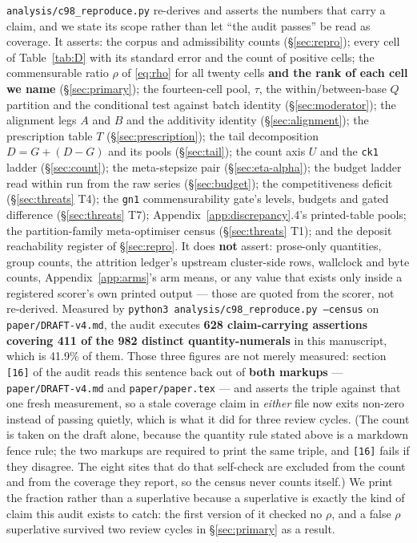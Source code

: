 \documentclass[10pt,letterpaper]{article}
\newcommand{\Dstat}{D}                         %
\newcommand{\Gstat}{G}                         %
\newcommand{\Astat}{A}                         %
\newcommand{\Tstat}{T}                         %
\newcommand{\Ustat}{U}                         %
\newcommand{\arm}[1]{\texttt{#1}}
\begin{document}
\texttt{analysis/c98\_reproduce.py} re-derives and asserts the numbers that carry a claim, and we
state its scope rather than let ``the audit passes'' be read as coverage. It asserts: the corpus
and admissibility counts (\S\ref{sec:repro}); every cell of Table~\ref{tab:D} with its standard
error and the count of positive cells; the commensurable ratio $\rho$ of \eqref{eq:rho} for all
twenty cells \textbf{and the rank of each cell we name} (\S\ref{sec:primary}); the fourteen-cell
pool, $\tau$, the within/between-base $Q$ partition and the conditional test against batch
identity (\S\ref{sec:moderator}); the alignment legs $\Astat$ and $B$ and the additivity identity
(\S\ref{sec:alignment}); the prescription table $\Tstat$ (\S\ref{sec:prescription}); the tail
decomposition $\Dstat = \Gstat + (\Dstat - \Gstat)$ and its pools (\S\ref{sec:tail}); the count
axis $\Ustat$ and the \arm{ck1} ladder (\S\ref{sec:count}); the meta-stepsize pair
(\S\ref{sec:eta-alpha}); the budget ladder read within run from the raw series
(\S\ref{sec:budget}); the competitiveness deficit (\S\ref{sec:threats} T4); the \arm{gn1}
commensurability gate's levels, budgets and gated difference (\S\ref{sec:threats} T7);
Appendix~\ref{app:discrepancy}.4's printed-table pools; the partition-family meta-optimiser
census (\S\ref{sec:threats} T1); and the deposit reachability register of \S\ref{sec:repro}. It
does \textbf{not} assert: prose-only quantities, group counts, the attrition ledger's upstream
cluster-side rows, wallclock and byte counts, Appendix~\ref{app:arms}'s arm means, or any value
that exists only inside a registered scorer's own printed output --- those are quoted from the
scorer, not re-derived. Measured by \texttt{python3 analysis/c98\_reproduce.py --census}
on \texttt{paper/DRAFT-v4.md}, the
audit executes \textbf{628 claim-carrying assertions covering 411 of the 982 distinct
quantity-numerals} in this manuscript, which is 41.9\% of them. Those three figures are not
merely measured: section \texttt{[16]} of the audit reads this sentence back out of
\textbf{both markups} --- \texttt{paper/DRAFT-v4.md} and \texttt{paper/paper.tex} --- and asserts
the triple against that one fresh measurement, so a stale coverage claim in \emph{either} file
now exits non-zero instead of passing quietly, which is what it did for three review cycles.
(The count is taken on the draft alone, because the quantity rule stated above is a markdown
fence rule; the two markups are required to print the same triple, and \texttt{[16]} fails if
they disagree. The eight sites that do that self-check are excluded from the count and from the
coverage they report, so the census never counts itself.) We print the fraction rather than a superlative
because a superlative is exactly the
kind of claim this audit exists to catch: the first version of it checked no $\rho$, and a false
$\rho$ superlative survived two review cycles in \S\ref{sec:primary} as a result.
\end{document}
